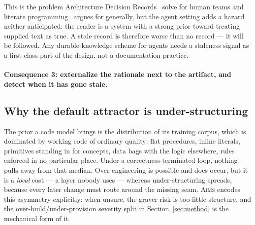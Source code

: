 \documentclass[11pt]{article}
\newcommand{\aims}{\textsc{Aims}}
\begin{document}
This is the problem Architecture Decision Records~\cite{nygard2011adr} solve for human teams and literate programming~\cite{knuth1984literate} argues for generally, but the agent setting adds a hazard neither anticipated: the reader is a system with a strong prior toward treating supplied text as true. A stale record is therefore worse than no record --- it will be followed. Any durable-knowledge scheme for agents needs a staleness signal as a first-class part of the design, not a documentation practice.

\paragraph{Consequence 3: externalize the rationale next to the artifact, and detect when it has gone stale.}

\subsection{Why the default attractor is under-structuring}

The prior a code model brings is the distribution of its training corpus, which is dominated by working code of ordinary quality: flat procedures, inline literals, primitives standing in for concepts, data bags with the logic elsewhere, rules enforced in no particular place. Under a correctness-terminated loop, nothing pulls away from that median. Over-engineering is possible and does occur, but it is a \emph{local} cost --- a layer nobody uses --- whereas under-structuring spreads, because every later change must route around the missing seam. \aims{} encodes this asymmetry explicitly: when unsure, the graver risk is too little structure, and the over-build/under-provision severity split in Section~\ref{sec:method} is the mechanical form of it.
\end{document}
